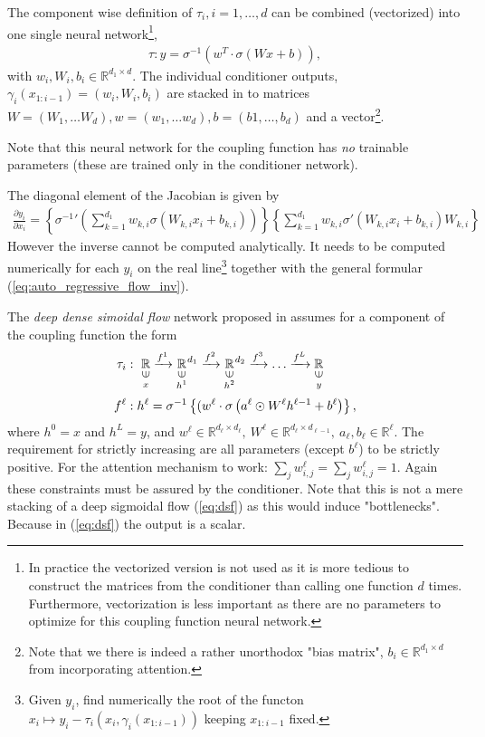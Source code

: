 \documentclass[12pt,a4paper]{article}
\newcommand{\vin}{\rotatebox[origin=c]{90}{$\in$}}
\newcommand{\cont}[2]{%
	\underset{\underset{\scriptstyle\mathstrut #2}{\vin}}{#1}%
}
\begin{document}
The component wise definition of $\tau_i, i=1,\dots,d$ can be combined (vectorized) into one single neural network\footnote{In practice the vectorized version is not used as it is more tedious to construct the matrices from the conditioner than calling one function $d$ times. Furthermore, vectorization is less important as there are no parameters to optimize for this coupling function neural network.},
\begin{align}
\tau: y = \sigma^{-1}\left(w^T \cdot \sigma \left(W  x + b\right)   \right),
\end{align}
with $w_i, W_i, b_i \in \mathbb{R}^{d_1\times d}$.
The individual conditioner outputs, $\gamma_i(x_{1:i-1}) = (w_i, W_i, b_i)$ are stacked in to matrices $W = (W_1, \dots W_d), w = (w_1, \dots w_d), b = (b1, \dots, b_{d})$ and a vector\footnote{Note that we there is indeed a rather unorthodox "bias matrix", $b_i \in \mathbb{R}^{d_1\times d}$ from incorporating attention.}.

Note that this neural network for the coupling function has \textit{no} trainable parameters (these are trained only in the conditioner network). 

The diagonal element of the Jacobian  is given by 
\begin{align}
	\frac{\partial y_i}{\partial x_i} = \left\{ {\sigma^{-1}}'\left(\sum_{k=1}^{d_1}w_{k,i}  \sigma \left(W_{k,i}  x_i + b_{k,i}\right)   \right)\right\} 
	\left\{\sum_{k=1}^{d_1} w_{k,i}  \sigma' \left(W_{k,i}  x_i + b_{k,i}\right) W_{k,i}   \right\}
\end{align}
However the inverse cannot be computed analytically. It needs to be computed numerically  for each $y_i$ on the real line\footnote{Given $y_i$, find numerically the root of the functon $x_i \mapsto y_i - \tau_i(x_i, \gamma_i(x_{1:i-1}))$ keeping $x_{1:i-1}$ fixed.} together with the general formular (\ref{eq:auto_regressive_flow_inv}).

The \textit{deep dense simoidal flow } network proposed in \cite{huang_2018_neural_autoregressive_flows} assumes for a component of the coupling function the form
\begin{align}
	 	\tau_i&: ~\cont{\mathbb{R}}{x} \xrightarrow{f^1} \cont{\mathbb{R}}{h^1}^{d_1} \xrightarrow{f^2} \cont{\mathbb{R}}{h^2}^{d_2} \xrightarrow{f^3} \dots \xrightarrow{f^L} \cont{\mathbb{R}}{y} \nonumber 
	\\ 
	f^\ell&: h^\ell= \sigma^{-1}\left\{(w^\ell \cdot \sigma \left(a^{\ell} \odot W^\ell h^{\ell -1}  + b^\ell\right)\right\} , 
\end{align}
where $h^0 = x$ and $h^L = y$, and $w^\ell \in \mathbb{R}^{d_\ell \times d_\ell}, ~ W^\ell \in \mathbb{R}^{d_\ell \times d_{\ell-1}}, ~ a_\ell , b_\ell \in \mathbb{R}^{\ell}$. The requirement for strictly increasing are all parameters (except $b^\ell$) to be strictly positive. For the attention mechanism to work: $\sum_j w^\ell_{i,j} = \sum_j w^\ell_{i,j}=1$. Again these constraints must be assured by the conditioner. 
Note that this is not a mere stacking of a deep sigmoidal flow (\ref{eq:dsf}) as this would induce  "bottlenecks". Because in (\ref{eq:dsf}) the output is a scalar.
\end{document}
